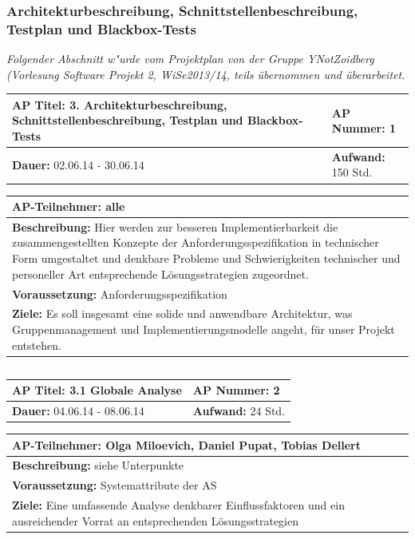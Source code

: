 \documentclass[fontsize=12pt,paper=a4,twoside]{scrartcl}
\begin{document}
\subsubsection{Architekturbeschreibung, Schnittstellenbeschreibung, Testplan und Blackbox-Tests}\label{aps}

\textit{Folgender Abschnitt w"urde vom Projektplan von der Gruppe YNotZoidberg (Vorlesung Software Projekt 2, WiSe2013/14, teils übernommen und überarbeitet.}

\begin{tabular}{|p{7.43cm}|p{7.43cm}|}
\hline
\textbf{AP Titel: }3. Architekturbeschreibung, Schnittstellenbeschreibung, Testplan und Blackbox-Tests & \textbf{AP Nummer: }1\\ 
\hline
\textbf{Dauer: }02.06.14 - 30.06.14& \textbf{Aufwand: }150 Std.\\
\hline
\end{tabular}
\begin{tabular}{|p{15.3cm}|}
\hline
\textbf{AP-Teilnehmer: }alle\\
\hline
\textbf{Beschreibung: }Hier werden zur besseren Implementierbarkeit die zusammengestellten Konzepte der Anforderungsspezifikation in technischer Form umgestaltet und denkbare Probleme und Schwierigkeiten technischer und personeller Art entsprechende Lösungsstrategien zugeordnet.  \\
\hline
\textbf{Voraussetzung: }Anforderungsspezifikation\\
\hline 
\textbf{Ziele: }Es soll insgesamt eine solide und anwendbare Architektur, was Gruppenmanagement und Implementierungsmodelle angeht,  für unser Projekt entstehen.\\
\hline 
\end{tabular}
\begin{verbatim}

\end{verbatim}

\begin{tabular}{|p{7.43cm}|p{7.43cm}|}
\hline
\textbf{AP Titel: } 3.1 Globale Analyse & \textbf{AP Nummer: }2\\ 
\hline
\textbf{Dauer: }04.06.14 - 08.06.14& \textbf{Aufwand: }24 Std.\\
\hline
\end{tabular}
\begin{tabular}{|p{15.3cm}|}
\hline
\textbf{AP-Teilnehmer: }Olga Miloevich, Daniel Pupat, Tobias Dellert\\
\hline
\textbf{Beschreibung: }siehe Unterpunkte\\
\hline
\textbf{Voraussetzung: }Systemattribute der AS\\
\hline 
\textbf{Ziele: }Eine umfassende Analyse denkbarer Einflussfaktoren und ein ausreichender Vorrat an entsprechenden Lösungsstrategien\\
\hline 
\end{tabular}
\begin{verbatim}

\end{verbatim}
\end{document}
